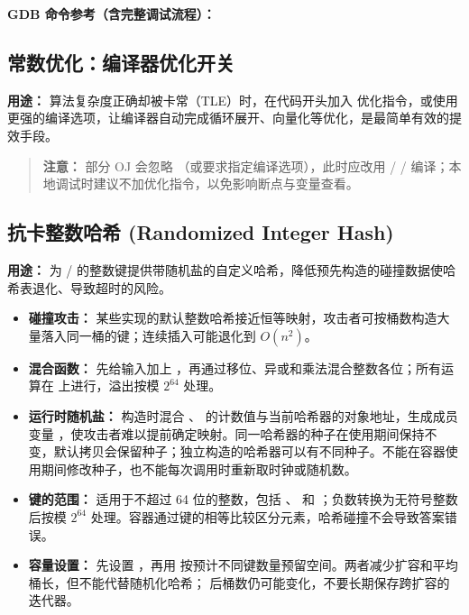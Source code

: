 \textbf{GDB 命令参考（含完整调试流程）：}



\subsection{常数优化：编译器优化开关}

\textbf{用途：} 算法复杂度正确却被卡常（TLE）时，在代码开头加入  优化指令，或使用更强的编译选项，让编译器自动完成循环展开、向量化等优化，是最简单有效的提效手段。



\begin{quote}
  \textbf{注意：} 部分 OJ 会忽略 （或要求指定编译选项），此时应改用  /  /  编译；本地调试时建议不加优化指令，以免影响断点与变量查看。
\end{quote}

\subsection{抗卡整数哈希 (Randomized Integer Hash)}

\textbf{用途：} 为  /  的整数键提供带随机盐的自定义哈希，降低预先构造的碰撞数据使哈希表退化、导致超时的风险。

\begin{itemize}
  \item \textbf{碰撞攻击：} 某些实现的默认整数哈希接近恒等映射，攻击者可按桶数构造大量落入同一桶的键；连续插入可能退化到 $O(n^2)$。
  \item \textbf{混合函数：}  先给输入加上 ，再通过移位、异或和乘法混合整数各位；所有运算在  上进行，溢出按模 $2^{64}$ 处理。
  \item \textbf{运行时随机盐：} 构造时混合 、 的计数值与当前哈希器的对象地址，生成成员变量 ，使攻击者难以提前确定映射。同一哈希器的种子在使用期间保持不变，默认拷贝会保留种子；独立构造的哈希器可以有不同种子。不能在容器使用期间修改种子，也不能每次调用时重新取时钟或随机数。
  \item \textbf{键的范围：} 适用于不超过 64 位的整数，包括 、 和 ；负数转换为无符号整数后按模 $2^{64}$ 处理。容器通过键的相等比较区分元素，哈希碰撞不会导致答案错误。
  \item \textbf{容量设置：} 先设置 ，再用  按预计不同键数量预留空间。两者减少扩容和平均桶长，但不能代替随机化哈希； 后桶数仍可能变化，不要长期保存跨扩容的迭代器。
\end{itemize}

